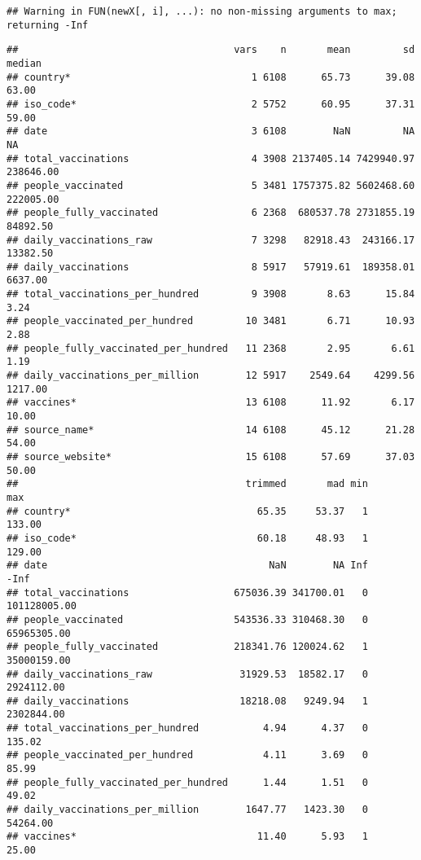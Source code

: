 \documentclass[
]{article}
\begin{document}
\begin{verbatim}
## Warning in FUN(newX[, i], ...): no non-missing arguments to max; returning -Inf
\end{verbatim}

\begin{verbatim}
##                                     vars    n       mean         sd    median
## country*                               1 6108      65.73      39.08     63.00
## iso_code*                              2 5752      60.95      37.31     59.00
## date                                   3 6108        NaN         NA        NA
## total_vaccinations                     4 3908 2137405.14 7429940.97 238646.00
## people_vaccinated                      5 3481 1757375.82 5602468.60 222005.00
## people_fully_vaccinated                6 2368  680537.78 2731855.19  84892.50
## daily_vaccinations_raw                 7 3298   82918.43  243166.17  13382.50
## daily_vaccinations                     8 5917   57919.61  189358.01   6637.00
## total_vaccinations_per_hundred         9 3908       8.63      15.84      3.24
## people_vaccinated_per_hundred         10 3481       6.71      10.93      2.88
## people_fully_vaccinated_per_hundred   11 2368       2.95       6.61      1.19
## daily_vaccinations_per_million        12 5917    2549.64    4299.56   1217.00
## vaccines*                             13 6108      11.92       6.17     10.00
## source_name*                          14 6108      45.12      21.28     54.00
## source_website*                       15 6108      57.69      37.03     50.00
##                                       trimmed       mad min          max
## country*                                65.35     53.37   1       133.00
## iso_code*                               60.18     48.93   1       129.00
## date                                      NaN        NA Inf         -Inf
## total_vaccinations                  675036.39 341700.01   0 101128005.00
## people_vaccinated                   543536.33 310468.30   0  65965305.00
## people_fully_vaccinated             218341.76 120024.62   1  35000159.00
## daily_vaccinations_raw               31929.53  18582.17   0   2924112.00
## daily_vaccinations                   18218.08   9249.94   1   2302844.00
## total_vaccinations_per_hundred           4.94      4.37   0       135.02
## people_vaccinated_per_hundred            4.11      3.69   0        85.99
## people_fully_vaccinated_per_hundred      1.44      1.51   0        49.02
## daily_vaccinations_per_million        1647.77   1423.30   0     54264.00
## vaccines*                               11.40      5.93   1        25.00

\end{verbatim}
\end{document}
